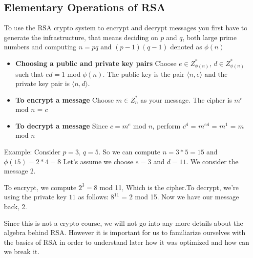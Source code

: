 \subsection{Elementary Operations of RSA}
To use the RSA crypto system to encrypt and decrypt messages you first have to
generate the infrastructure, that means deciding on $p$ and $q$, both large prime
numbers and computing $n = pq$ and $(p-1)(q-1)$ denoted as $\phi(n)$

\begin{itemize}
    \item \textbf{Choosing a public and private key pairs}
    Choose $e \in Z^{*}_{\phi(n)}$, $d \in Z^{*}_{\phi(n)}$ such that $ed = 1$
    mod $\phi(n)$. The public key is the pair $\langle{n,e}\rangle$  and the
    private key pair is  $\langle{n,d}\rangle$.
    \item \textbf{To encrypt a message}
    Choose $m \in Z^{*}_n$ as your message. The cipher is $m^{e}$ mod $n$ = $c$
    \item \textbf{To decrypt a message}
    Since $c = m^{e}$ mod $n$, perform $c^{d}$ = $m^{ed}$ = $m^{1}$ = $m$ mod
    $n$
\end{itemize}

Example: Consider $p = 3$, $q = 5$. So we can compute $n = 3*5 = 15$ and
$\phi(15) = 2 * 4 = 8$ Let's assume we choose $e = 3$ and $d=11$. We consider
the message 2.

To encrypt, we compute $2^{3} = 8$ mod 11, Which is the cipher.To decrypt,
we're using the private key $11$ as follows: $8^{11}$ = 2 mod 15. Now we
have our message back, 2.

Since this is not a crypto course, we will not go into any more details
about the algebra behind RSA. However it is important for us to familiarize ourselves
with the basics of RSA in order to understand later how it was optimized and how
can we break it.

